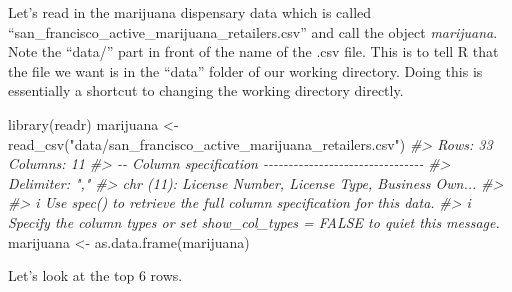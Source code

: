 \documentclass[
]{krantz}
\makeatletter
\newenvironment{Shaded}{\begin{snugshade}}{\end{snugshade}}
\newcommand{\CommentTok}[1]{\textcolor[rgb]{0.37,0.37,0.37}{\textit{#1}}}
\newcommand{\FunctionTok}[1]{\textcolor[rgb]{0,0,0}{#1}}
\newcommand{\NormalTok}[1]{#1}
\newcommand{\OtherTok}[1]{\textcolor[rgb]{0.37,0.37,0.37}{#1}}
\newcommand{\StringTok}[1]{\textcolor[rgb]{0.5,0.5,0.5}{#1}}
\newenvironment{kframe}{%
\medskip{}
\setlength{\fboxsep}{.8em}
 \def\at@end@of@kframe{}%
 \ifinner\ifhmode%
  \def\at@end@of@kframe{\end{minipage}}%
  \begin{minipage}{\columnwidth}%
 \fi\fi%
 \def\FrameCommand##1{\hskip\@totalleftmargin \hskip-\fboxsep
 \colorbox{shadecolor}{##1}\hskip-\fboxsep
     \hskip-\linewidth \hskip-\@totalleftmargin \hskip\columnwidth}%
 \MakeFramed {\advance\hsize-\width
   \@totalleftmargin\z@ \linewidth\hsize
   \@setminipage}}%
 {\par\unskip\endMakeFramed%
 \at@end@of@kframe}
\renewenvironment{Shaded}{\begin{kframe}}{\end{kframe}}
\makeatother
\begin{document}
Let's read in the marijuana dispensary data which is called ``san\_francisco\_active\_marijuana\_retailers.csv'' and call the object \emph{marijuana}. Note the ``data/'' part in front of the name of the .csv file. This is to tell R that the file we want is in the ``data'' folder of our working directory. Doing this is essentially a shortcut to changing the working directory directly.

\begin{Shaded}
\begin{Highlighting}[]
\FunctionTok{library}\NormalTok{(readr)}
\NormalTok{marijuana }\OtherTok{\textless{}{-}} \FunctionTok{read\_csv}\NormalTok{(}\StringTok{"data/san\_francisco\_active\_marijuana\_retailers.csv"}\NormalTok{)}
\CommentTok{\#\textgreater{} Rows: 33 Columns: 11}
\CommentTok{\#\textgreater{} {-}{-} Column specification {-}{-}{-}{-}{-}{-}{-}{-}{-}{-}{-}{-}{-}{-}{-}{-}{-}{-}{-}{-}{-}{-}{-}{-}{-}{-}{-}{-}{-}{-}{-}{-}}
\CommentTok{\#\textgreater{} Delimiter: ","}
\CommentTok{\#\textgreater{} chr (11): License Number, License Type, Business Own...}
\CommentTok{\#\textgreater{} }
\CommentTok{\#\textgreater{} i Use \textasciigrave{}spec()\textasciigrave{} to retrieve the full column specification for this data.}
\CommentTok{\#\textgreater{} i Specify the column types or set \textasciigrave{}show\_col\_types = FALSE\textasciigrave{} to quiet this message.}
\NormalTok{marijuana }\OtherTok{\textless{}{-}} \FunctionTok{as.data.frame}\NormalTok{(marijuana)}
\end{Highlighting}
\end{Shaded}

Let's look at the top 6 rows.
\end{document}
